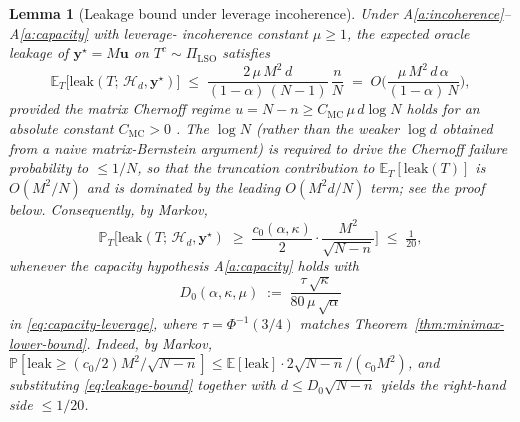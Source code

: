 \documentclass[11pt,a4paper]{article}
\theoremstyle{plain}
\newtheorem{lemma}[theorem]{Lemma}
\theoremstyle{definition}
\theoremstyle{remark}
\newcommand{\by}{\mathbf{y}}
\newcommand{\bu}{\mathbf{u}}
\newcommand{\E}{\mathbb{E}}
\newcommand{\PR}{\mathbb{P}}
\newcommand{\Hcal}{\mathcal{H}}
\begin{document}
\begin{lemma}[Leakage bound under leverage incoherence]
\label{lem:leakage}
Under A\ref{a:incoherence}--A\ref{a:capacity} with leverage-%
incoherence constant $\mu \ge 1$, the expected oracle leakage of
$\by^\star = M\bu$ on $T^c \sim \Pi_{\mathrm{LSO}}$ satisfies
\begin{equation}
    \E_T\!\big[\mathrm{leak}(T;\, \Hcal_d, \by^\star)\big]
    \;\le\; \frac{2\,\mu\, M^2\, d}{(1-\alpha)\,(N-1)}\,\frac{n}{N}
    \;=\; O\!\Big(\frac{\mu\,M^2\,d\,\alpha}{(1-\alpha)\,N}\Big),
    \label{eq:leakage-bound}
\end{equation}
provided the matrix Chernoff regime $u = N - n \ge C_\mathrm{MC}\,
\mu\, d \log N$ holds for an absolute constant $C_\mathrm{MC} > 0$
\citep[Theorem~1.1]{Tropp2015}. The $\log N$ (rather than the
weaker $\log d$ obtained from a naive matrix-Bernstein argument)
is required to drive the Chernoff failure probability to
$\le 1/N$, so that the truncation contribution to
$\E_T[\mathrm{leak}(T)]$ is $O(M^2/N)$ and is dominated by the
leading $O(M^2 d/N)$ term; see the proof below.
Consequently, by Markov,
\begin{equation}
    \PR_T\!\Big[
        \mathrm{leak}(T;\, \Hcal_d, \by^\star)
        \;\ge\; \frac{c_0(\alpha,\kappa)}{2}\cdot \frac{M^2}{\sqrt{N-n}}
    \Big]
    \;\le\; \tfrac{1}{20},
    \label{eq:leakage-tail}
\end{equation}
whenever the capacity hypothesis A\ref{a:capacity} holds with
\begin{equation}
    D_0(\alpha, \kappa, \mu) \;:=\; \frac{\tau\,\sqrt{\kappa}}{80\,\mu\,\sqrt{\alpha}}
    \label{eq:D0-explicit}
\end{equation}
in \eqref{eq:capacity-leverage}, where $\tau = \Phi^{-1}(3/4)$
matches Theorem~\ref{thm:minimax-lower-bound}.  Indeed, by Markov,
$\PR[\mathrm{leak} \ge (c_0/2) M^2/\sqrt{N-n}] \le \E[\mathrm{leak}]
\cdot 2\sqrt{N-n}/(c_0 M^2)$, and substituting
\eqref{eq:leakage-bound} together with
$d \le D_0\sqrt{N-n}$ yields the right-hand side $\le 1/20$.
\end{lemma}
\end{document}
